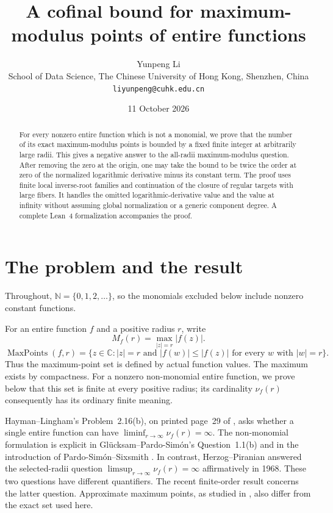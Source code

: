 \documentclass[11pt]{article}
\title{A cofinal bound for maximum-modulus points of entire functions}
\author{Yunpeng Li\\[3pt]
 \small School of Data Science, The Chinese University of Hong Kong, Shenzhen, China\\
 \small\texttt{liyunpeng@cuhk.edu.cn}}
\date{11 October 2026}
\numberwithin{equation}{section}
\newcommand{\C}{\mathbb C}
\newcommand{\N}{\mathbb N}
\newcommand{\Max}{\operatorname{MaxPoints}}
\begin{document}
\maketitle

\begin{abstract}
For every nonzero entire function which is not a monomial, we prove that
the number of its exact maximum-modulus points is bounded by a fixed finite
integer at arbitrarily large radii. This gives a negative answer to the
all-radii maximum-modulus question. After removing the zero at the origin,
one may take the bound to be twice the order at zero of the normalized
logarithmic derivative minus its constant term. The proof uses finite local
inverse-root families and continuation of the closure of regular targets
with large fibers. It handles the omitted logarithmic-derivative value and
the value at infinity without assuming global normalization or a generic
component degree. A complete Lean~4 formalization accompanies the proof.
\end{abstract}

\section{The problem and the result}\label{sec:introduction}

Throughout, $\N=\{0,1,2,\ldots\}$, so the monomials excluded below include
nonzero constant functions.

For an entire function $f$ and a positive radius $r$, write
\[
 M_f(r)=\max_{|z|=r}|f(z)|.
\]
\[
 \Max(f,r)=\{z\in\C:|z|=r\text{ and }
             |f(w)|\le |f(z)|\text{ for every }w\text{ with }|w|=r\}.
\]
Thus the maximum-point set is defined by actual function values. The maximum
exists by compactness. For a nonzero non-monomial entire function, we prove
below that this set is finite at every positive radius; its cardinality
$\nu_f(r)$ consequently has its ordinary finite meaning.

Hayman--Lingham's Problem~2.16(b), on printed page~29 of
\cite{HL}, asks whether a single entire function can have
$\liminf_{r\to\infty}\nu_f(r)=\infty$. The non-monomial formulation is
explicit in Gl\"ucksam--Pardo-Sim\'on's Question~1.1(b) \cite{GP} and in
the introduction of Pardo-Sim\'on--Sixsmith \cite{PS}. In contrast,
Herzog--Piranian \cite{HP} answered the selected-radii question
$\limsup_{r\to\infty}\nu_f(r)=\infty$ affirmatively in 1968. These two
questions have different quantifiers. The recent finite-order result
\cite{PS} concerns the latter question. Approximate maximum points,
as studied in \cite{GP}, also differ from the exact set used here.
\end{document}
